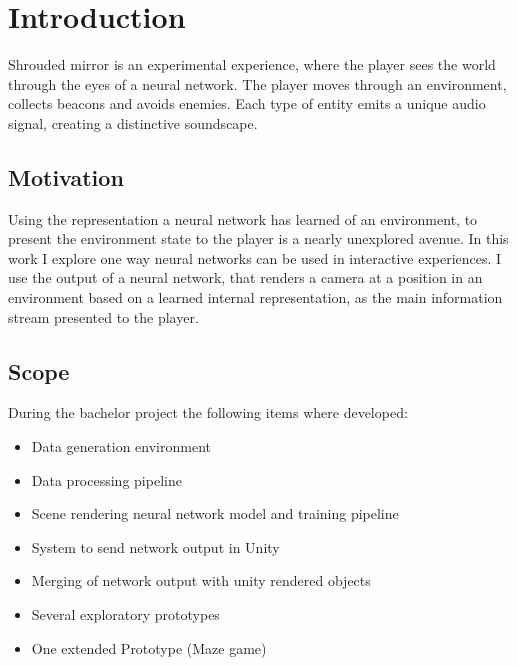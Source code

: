 
\chapter{Introduction}
Shrouded mirror is an experimental experience, where the player sees the world through the eyes of a neural network. The player moves through an environment, collects beacons and avoids enemies. Each type of entity emits a unique audio signal, creating a distinctive soundscape.

\section{Motivation}
Using the representation a neural network has learned of an environment, to present the environment state to the player is a nearly unexplored avenue.
In this work I explore one way neural networks can be used in interactive experiences. I use the output of a neural network, that renders a camera at a position in an environment based on a learned internal representation, as the main information stream presented to the player.

\section{Scope}
During the bachelor project the following items where developed:

\begin{itemize}
\item{Data generation environment}
\item{Data processing pipeline}
\item{Scene rendering neural network model and training pipeline}
\item{System to send network output in Unity}
\item{Merging of network output with unity rendered objects}
\item{Several exploratory prototypes}
\item{One extended Prototype (Maze game)}
\end{itemize}
